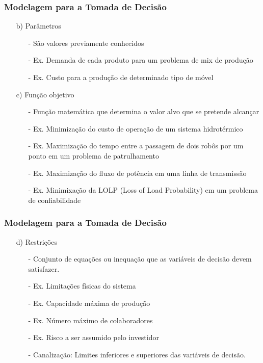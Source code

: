 \documentclass{beamer}
\begin{document}
\begin{frame}
	\frametitle{Modelagem para a Tomada de Decisão}
	\begin{itemize}
	\item[b)] {Parâmetros}
		\begin{itemize}
		\item[-] São valores previamente conhecidos
		\item[-] Ex. Demanda de cada produto para um problema de mix de produção
		\item[-] Ex. Custo para a produção de determinado tipo de móvel
		\end{itemize}
	\item[c)] {Função objetivo}
		\begin{itemize}
		\item[-] Função matemática que determina o valor alvo que se pretende alcançar
		\item[-] Ex. Minimização do custo de operação de um sistema hidrotérmico
		\item[-] Ex. Maximização do tempo entre a passagem de dois robôs por um ponto em um problema de patrulhamento
		\item[-] Ex. Maximização do fluxo de potência em uma linha de transmissão
		\item[-] Ex. Minimixação da LOLP (Loss of Load Probability) em um problema de confiabilidade
		\end{itemize}	
	\end{itemize}
\end{frame}

\begin{frame}
	\frametitle{Modelagem para a Tomada de Decisão}
	\begin{itemize}
	\item[d)] {Restrições}
		\begin{itemize}
		\item[-] Conjunto de equações ou inequação que as variáveis de decisão devem satisfazer.
		\item[-] Ex. Limitações físicas do sistema
		\item[-] Ex. Capacidade máxima de produção
		\item[-] Ex. Número máximo de colaboradores
		\item[-] Ex. Risco a ser assumido pelo investidor
		\item[-] Canalização: Limites inferiores e superiores das variáveis de decisão.
		\end{itemize}
	\end{itemize}
\end{frame}
\end{document}
